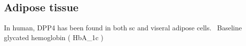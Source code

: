 \subsection{Adipose tissue}
In human, DPP4 has been found in both sc and viseral adipose cells.~\cite{Lamers2011} Baseline glycated hemoglobin ( HbA_{1c} \]) 